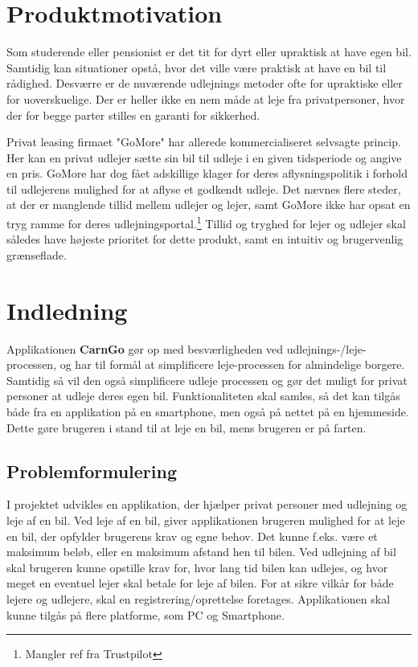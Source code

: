 \documentclass[a4paper,12pt,fleqn,oneside]{article}
\begin{document}

\tableofcontents \newpage
\section{Produktmotivation}
Som studerende eller pensionist er det tit for dyrt eller upraktisk at have egen bil. Samtidig kan situationer opstå, hvor det ville være praktisk at have en bil til rådighed. Desværre er de nuværende udlejnings metoder ofte for upraktiske eller for uoverskuelige. Der er heller ikke en nem måde at leje fra privatpersoner, hvor der for begge parter stilles en garanti for sikkerhed. 

Privat leasing firmaet "GoMore" har allerede kommercialiseret selvsagte princip. Her kan en privat udlejer sætte sin bil til udleje i en given tidsperiode og angive en pris. GoMore har dog fået adskillige klager for deres aflysningspolitik i forhold til udlejerens mulighed for at aflyse et godkendt udleje. Det nævnes flere steder, at der er manglende tillid mellem udlejer og lejer, samt GoMore ikke har opsat en tryg ramme for deres udlejningsportal.\footnote{Mangler ref fra Trustpilot} Tillid og tryghed for lejer og udlejer skal således have højeste prioritet for dette produkt, samt en intuitiv og brugervenlig grænseflade.   

\section{Indledning}
Applikationen \textbf{CarnGo} gør op med besværligheden ved udlejnings-/leje-processen, og har til formål at simplificere leje-processen for almindelige borgere. Samtidig så vil den også simplificere udleje processen og gør det muligt for privat personer at udleje deres egen bil. Funktionaliteten skal samles, så det kan tilgås både fra en applikation på en smartphone, men også på nettet på en hjemmeside. Dette gøre brugeren i stand til at leje en bil, mens brugeren er på farten.

\subsection{Problemformulering}
I projektet udvikles en applikation, der hjælper privat personer med udlejning og leje af en bil. Ved leje af en bil, giver applikationen brugeren mulighed for at leje en bil, der opfylder brugerens krav og egne behov. Det kunne f.eks. være et maksimum beløb, eller en maksimum afstand hen til bilen. Ved udlejning af bil skal brugeren kunne opstille krav for, hvor lang tid bilen kan udlejes, og hvor meget en eventuel lejer skal betale for leje af bilen. For at sikre vilkår for både lejere og udlejere, skal en registrering/oprettelse foretages. Applikationen skal kunne tilgås på flere platforme, som PC og Smartphone.
\end{document}
